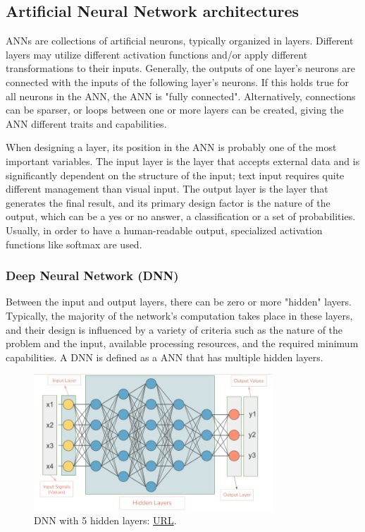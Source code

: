 \subsection{Artificial Neural Network architectures}
ANNs are collections of artificial neurons, typically organized in layers. Different layers may utilize different activation functions and/or apply different transformations to their inputs. Generally, the outputs of one layer's neurons are connected with the inputs of the following layer's neurons. If this holds true for all neurons in the ANN, the ANN is "fully connected". Alternatively, connections can be sparser, or loops between one or more layers can be created, giving the ANN different traits and capabilities.

When designing a layer, its position in the ANN is probably one of the most important variables. The input layer is the layer that accepts external data and is significantly dependent on the structure of the input; text input requires quite different management than visual input. The output layer is the layer that generates the final result, and its primary design factor is the nature of the output, which can be a yes or no answer, a classification or a set of probabilities. Usually, in order to have a human-readable output, specialized activation functions like softmax are used.

\subsubsection{Deep Neural Network (DNN)}
Between the input and output layers, there can be zero or more "hidden" layers. Typically, the majority of the network's computation takes place in these layers, and their design is influenced by a variety of criteria such as the nature of the problem and the input, available processing resources, and the required minimum capabilities. A DNN is defined as a ANN that has multiple hidden layers.\cite{IBM_Neural_Networks}
\begin{figure}[H]
    \centering
        \includegraphics[width=0.8\textwidth]{Images/ANNArchitectures/dnn.png}
        \decoRule
        \caption[Deep neural network]{DNN with 5 hidden layers: \href{http://www.gabormelli.com/RKB/Multi_Hidden-Layer_(Deep)_Neural_Network}{URL}.}
        \label{fig:Deep neural network}
\end{figure}


